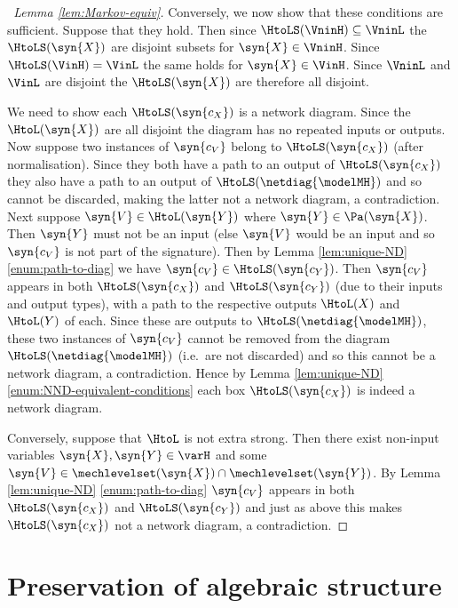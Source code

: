 \documentclass{article}
\begin{document}
{\begin{proof}[\proofof~Lemma \ref{lem:Markov-equiv}]
Conversely, we now show that these conditions are sufficient. Suppose that they hold. Then since $\HtoLS(\VninH) \subseteq \VninL$ the $\HtoLS(\syn{X})$ are disjoint subsets for $\syn{X} \in \VninH$. Since $\HtoLS(\VinH) = \VinL$ the same holds for $\syn{X} \in \VinH$. Since $\VninL$ and $\VinL$ are disjoint the $\HtoLS(\syn{X})$ are therefore all disjoint.

We need to show each $\HtoLS(\syn{c_X})$ is a network diagram. Since the $\HtoL(\syn{X})$ are all disjoint the diagram has no repeated inputs or outputs. Now suppose two instances of $\syn{c_V}$ belong to $\HtoLS(\syn{c_X})$ (after normalisation). Since they both have a path to an output of $\HtoLS(\syn{c_X})$ they also have a path to an output of $\HtoLS(\netdiag{\modelMH})$ and so cannot be discarded, making the latter not a network diagram, a contradiction. Next suppose $\syn{V} \in \HtoL(\syn{Y})$ where $\syn{Y} \in \Pa(\syn{X})$. Then $\syn{Y}$ must not be an input (else $\syn{V}$ would be an input and so $\syn{c_V}$ is not part of the signature). Then by Lemma \ref{lem:unique-ND} \eqref{enum:path-to-diag} we have $\syn{c_V} \in \HtoLS(\syn{c_Y})$. Then $\syn{c_V}$ appears in both $\HtoLS(\syn{c_X})$ and $\HtoLS(\syn{c_Y})$ (due to their inputs and output types), with a path to the respective outputs $\HtoL(X)$ and $\HtoL(Y)$ of each. Since these are outputs to $\HtoLS(\netdiag{\modelMH})$, these two instances of $\syn{c_V}$ cannot be removed from the diagram $\HtoLS(\netdiag{\modelMH})$ (i.e.~are not discarded) and so this cannot be a network diagram, a contradiction. Hence by Lemma \ref{lem:unique-ND} \eqref{enum:NND-equivalent-conditions} each box $\HtoLS(\syn{c_X})$ is indeed a network diagram.

Conversely, suppose that $\HtoL$ is not extra strong. Then there exist non-input variables $\syn{X},\syn{Y} \in \varH$ and some $\syn{V} \in \mechlevelset(\syn{X}) \cap \mechlevelset(\syn{Y})$. By Lemma \ref{lem:unique-ND} \eqref{enum:path-to-diag} $\syn{c_V}$ appears in both $\HtoLS(\syn{c_X})$ and $\HtoLS(\syn{c_Y})$ and just as above this makes $\HtoLS(\syn{c_X})$ not a network diagram, a contradiction. 
\end{proof}


\section{Preservation of algebraic structure} \label{sec:alg-structure}

}
\end{document}
